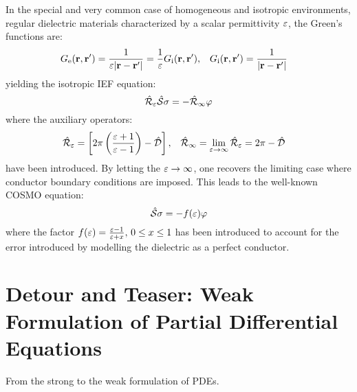 In the special and very common case of homogeneous and isotropic
environments, \ie regular dielectric materials characterized by a scalar
permittivity $\varepsilon$, the Green's functions are:
\begin{alignat}{2}
  G_\mathrm{e}(\mathbf{r}, \mathbf{r}^\prime) = \frac{1}{\varepsilon|\mathbf{r}-\mathbf{r}^\prime|} = \frac{1}{\varepsilon} G_\mathrm{i}(\mathbf{r}, \mathbf{r}^\prime),
  \quad&
  G_\mathrm{i}(\mathbf{r}, \mathbf{r}^\prime) = \frac{1}{|\mathbf{r}-\mathbf{r}^\prime|}
\end{alignat}
yielding the isotropic \acs{IEF} equation:
\begin{equation}\label{eq:isotropic-IEF}
  \hat{\mathcal{R}}_\varepsilon\hat{\mathcal{S}}\sigma = - \hat{\mathcal{R}}_\infty\varphi
\end{equation}
where the auxiliary operators:
\begin{alignat}{2}
  \hat{\mathcal{R}}_\varepsilon = \left[
  2\pi \left(\frac{\varepsilon+1}{\varepsilon-1}\right) - \hat{\mathcal{D}}
  \right],
  \quad&
  \hat{\mathcal{R}}_\infty =  \lim_{\varepsilon\rightarrow\infty}\hat{\mathcal{R}}_\varepsilon
  = 2\pi-\hat{\mathcal{D}}
\end{alignat}
have been introduced.
By letting the $\varepsilon\rightarrow\infty$, one recovers the limiting case
where conductor boundary conditions are imposed. This leads to the
well-known \ac{COSMO} equation:~\autocite{Klamt1993-mj, Cossi2003-xe}
\begin{equation}
  \hat{\mathcal{S}}\sigma = - f(\varepsilon)\varphi
\end{equation}
where the factor $f(\varepsilon) = \frac{\varepsilon-1}{\varepsilon+x},\, 0\leq x \leq 1$
has been introduced to account for the error introduced by modelling the
dielectric as a perfect conductor.

\section{Detour and Teaser: Weak Formulation of Partial Differential Equations}\label{sec:weak}

From the strong to the weak formulation of \acp{PDE}.\autocite{Ern2004-oo}

